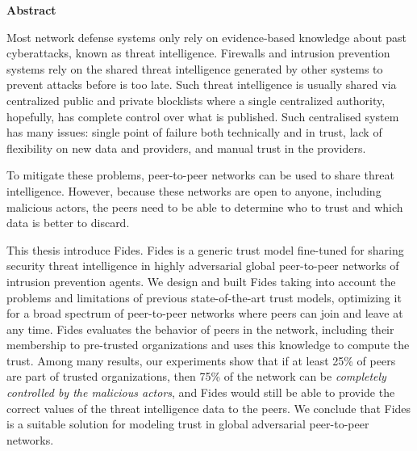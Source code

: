 \newenvironment{abstractpage}
  {\cleardoublepage\thispagestyle{empty}}
  {\vfill\cleardoublepage}
\newenvironment{abstract}[1]
  {\bigskip
   \begin{center}\bfseries#1\end{center}\small\leftskip=0.5cm\rightskip=0.5cm}
  {\par\bigskip}

\providecommand{\keywords}[2]{\footnotesize\textbf{\textit{#1:}} #2}

\begin{abstractpage}
\begin{abstract}{Abstract}

Most network defense systems only rely on evidence-based knowledge about past cyberattacks, known as threat intelligence. Firewalls and intrusion prevention systems rely on the shared threat intelligence generated by other systems to prevent attacks before is too late.
Such threat intelligence is usually shared via centralized public and private blocklists where a single centralized authority, hopefully, has complete control over what is published. Such centralised system has many issues: single point of failure both technically and in trust, lack of flexibility on new data and providers, and manual trust in the providers.

To mitigate these problems, peer-to-peer networks can be used to share threat intelligence. However, because these networks are open to anyone, including malicious actors, the peers need to be able to determine who to trust and which data is better to discard.

This thesis introduce Fides. Fides is a generic trust model fine-tuned for sharing security threat intelligence in highly adversarial global peer-to-peer networks of intrusion prevention agents.
We design and built Fides taking into account the problems and limitations of previous state-of-the-art trust models, optimizing it for a broad spectrum of peer-to-peer networks where peers can join and leave at any time.
Fides evaluates the behavior of peers in the network, including their membership to pre-trusted organizations and uses this knowledge to compute the trust.
Among many results, our experiments show that if at least 25\% of peers are part of trusted organizations, then 75\% of the network can be \textit{completely controlled by the malicious actors}, and Fides would still be able to provide the correct values of the threat intelligence data to the peers. We conclude that Fides is a suitable solution for modeling trust in global adversarial peer-to-peer networks. 


\end{abstract}
\end{abstractpage}
